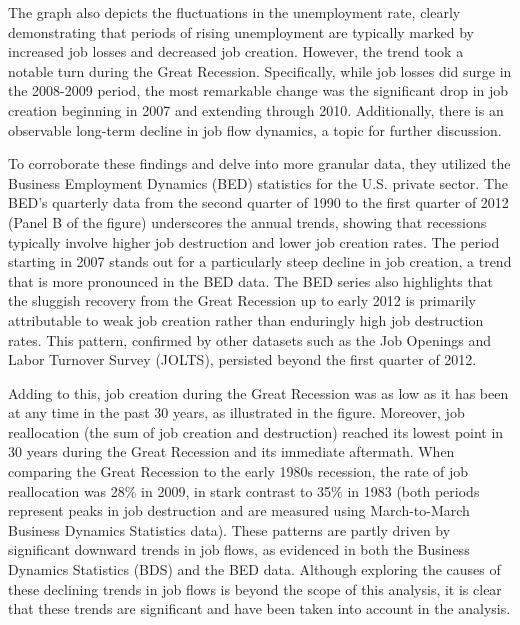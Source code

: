 \documentclass[12pt]{article}
\begin{document}
The graph also depicts the fluctuations in the unemployment rate, clearly demonstrating that periods of rising
unemployment are typically marked by increased job losses and decreased job creation. However, the trend took a notable
turn during the Great Recession. Specifically, while job losses did surge in the 2008-2009 period, the most remarkable
change was the significant drop in job creation beginning in 2007 and extending through 2010. Additionally, there is an
observable long-term decline in job flow dynamics, a topic for further discussion. 

To corroborate these findings and delve into more granular data, they utilized the Business Employment Dynamics (BED)
statistics for the U.S. private sector. The BED's quarterly data from the second quarter of 1990 to the first quarter of
2012 (Panel B of the figure) underscores the annual trends, showing that recessions typically involve higher job
destruction and lower job creation rates. The period starting in 2007 stands out for a particularly steep decline in job
creation, a trend that is more pronounced in the BED data. The BED series also highlights that the sluggish recovery
from the Great Recession up to early 2012 is primarily attributable to weak job creation rather than enduringly high job
destruction rates. This pattern, confirmed by other datasets such as the Job Openings and Labor Turnover Survey (JOLTS),
persisted beyond the first quarter of 2012. 

Adding to this, job creation during the Great Recession was as low as it has been at any time in the past 30 years, as
illustrated in the figure. Moreover, job reallocation (the sum of job creation and destruction) reached its lowest point
in 30 years during the Great Recession and its immediate aftermath. When comparing the Great Recession to the early
1980s recession, the rate of job reallocation was 28\% in 2009, in stark contrast to 35\% in 1983 (both periods represent
peaks in job destruction and are measured using March-to-March Business Dynamics Statistics data). These patterns are
partly driven by significant downward trends in job flows, as evidenced in both the Business Dynamics Statistics (BDS)
and the BED data. Although exploring the causes of these declining trends in job flows is beyond the scope of this
analysis, it is clear that these trends are significant and have been taken into account in the analysis. 
\end{document}
